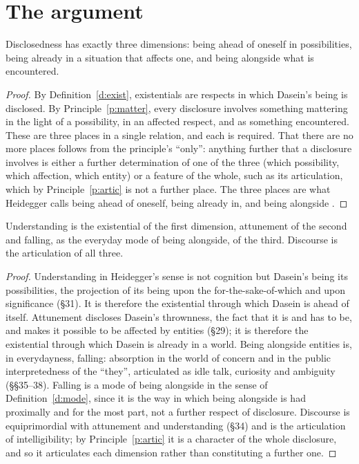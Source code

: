 \documentclass{situationist-preprint}
\begin{document}
\section{The argument}\label{s:arg}

\begin{lemma}\label{l:three}
Disclosedness has exactly three dimensions: being ahead of oneself in possibilities, being already in a situation that affects one, and being alongside what is encountered.
\end{lemma}

\begin{proof}
By Definition~\ref{d:exist}, existentials are respects in which Dasein's being is disclosed. By Principle~\ref{p:matter}, every disclosure involves something mattering in the light of a possibility, in an affected respect, and as something encountered. These are three places in a single relation, and each is required. That there are no more places follows from the principle's \enquote{only}: anything further that a disclosure involves is either a further determination of one of the three (which possibility, which affection, which entity) or a feature of the whole, such as its articulation, which by Principle~\ref{p:artic} is not a further place. The three places are what Heidegger calls being ahead of oneself, being already in, and being alongside \citep[\S41]{Heidegger1927}.
\end{proof}

\begin{lemma}[Correspondence]\label{l:corr}
Understanding is the existential of the first dimension, attunement of the second and falling, as the everyday mode of being alongside, of the third. Discourse is the articulation of all three.
\end{lemma}

\begin{proof}
Understanding in Heidegger's sense is not cognition but Dasein's being its possibilities, the projection of its being upon the for-the-sake-of-which and upon significance (\S31). It is therefore the existential through which Dasein is ahead of itself. Attunement discloses Dasein's thrownness, the fact that it is and has to be, and makes it possible to be affected by entities (\S29); it is therefore the existential through which Dasein is already in a world. Being alongside entities is, in everydayness, falling: absorption in the world of concern and in the public interpretedness of the \enquote{they}, articulated as idle talk, curiosity and ambiguity (\S\S35--38). Falling is a mode of being alongside in the sense of Definition~\ref{d:mode}, since it is the way in which being alongside is had proximally and for the most part, not a further respect of disclosure. Discourse is equiprimordial with attunement and understanding (\S34) and is the articulation of intelligibility; by Principle~\ref{p:artic} it is a character of the whole disclosure, and so it articulates each dimension rather than constituting a further one.
\end{proof}
\end{document}
